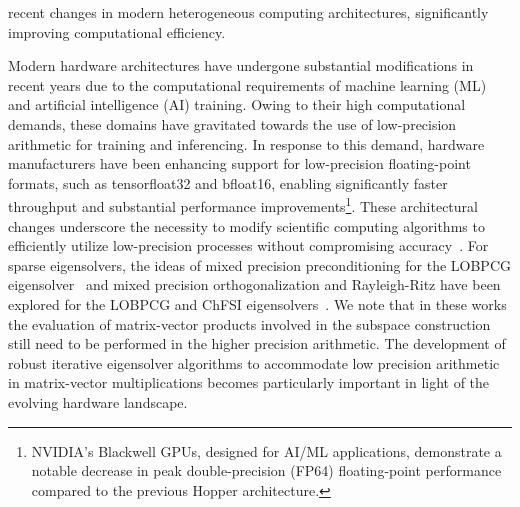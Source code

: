\documentclass[preprint,3p,number,sort&compress]{elsarticle}
\newcommand{\bx}{\textbf{x}}
\newcommand{\bA}{\textbf{A}}
\newcommand{\bB}{\textbf{B}}
\begin{document}
recent changes in modern heterogeneous computing architectures, significantly improving computational efficiency.



Modern hardware architectures have undergone substantial modifications in recent years due to the computational requirements of machine learning (ML) and artificial intelligence (AI) training. Owing to their high computational demands, these domains have gravitated towards the use of low-precision arithmetic for training and inferencing. In response to this demand, hardware manufacturers have been enhancing support for low-precision floating-point formats, such as tensorfloat32 and bfloat16, enabling significantly faster throughput and substantial performance improvements\footnote{NVIDIA's Blackwell GPUs, designed for AI/ML applications, demonstrate a notable decrease in peak double-precision (FP64) floating-point performance~\cite{HGXAISupercomputing} compared to the previous Hopper architecture.}. These architectural changes underscore the necessity to modify scientific computing algorithms to efficiently utilize low-precision processes without compromising accuracy~\cite{dongarraHardwareTrendsImpacting2024,kashiMixedprecisionNumericsScientific2025}. For sparse eigensolvers, the ideas of mixed precision preconditioning for the LOBPCG eigensolver~\cite{kressnerMixedPrecisionLOBPCG2023} and mixed precision orthogonalization and Rayleigh-Ritz have been explored for the LOBPCG and ChFSI eigensolvers~\cite{kressnerMixedPrecisionLOBPCG2023,dasDFTFE10Massively2022,motamarriDFTFEMassivelyParallel2020}. We note that in these works the evaluation of matrix-vector products involved in the subspace construction still need to be performed in the higher precision arithmetic. The development of robust iterative eigensolver algorithms to accommodate low precision arithmetic in matrix-vector multiplications becomes particularly important in light of the evolving hardware landscape.
\end{document}

